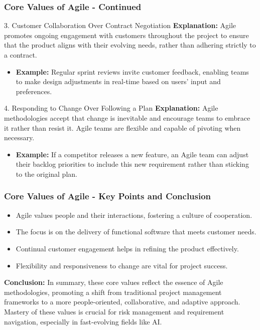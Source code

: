 \documentclass{beamer}
\begin{document}
\begin{frame}[fragile]
    \frametitle{Core Values of Agile - Continued}
    \begin{block}{3. Customer Collaboration Over Contract Negotiation}
        \textbf{Explanation:} Agile promotes ongoing engagement with customers throughout the project to ensure that the product aligns with their evolving needs, rather than adhering strictly to a contract.
        \begin{itemize}
            \item \textbf{Example:} Regular sprint reviews invite customer feedback, enabling teams to make design adjustments in real-time based on users’ input and preferences.
        \end{itemize}
    \end{block}

    \begin{block}{4. Responding to Change Over Following a Plan}
        \textbf{Explanation:} Agile methodologies accept that change is inevitable and encourage teams to embrace it rather than resist it. Agile teams are flexible and capable of pivoting when necessary.
        \begin{itemize}
            \item \textbf{Example:} If a competitor releases a new feature, an Agile team can adjust their backlog priorities to include this new requirement rather than sticking to the original plan.
        \end{itemize}
    \end{block}
\end{frame}

\begin{frame}[fragile]
    \frametitle{Core Values of Agile - Key Points and Conclusion}
    \begin{itemize}
        \item Agile values people and their interactions, fostering a culture of cooperation.
        \item The focus is on the delivery of functional software that meets customer needs.
        \item Continual customer engagement helps in refining the product effectively.
        \item Flexibility and responsiveness to change are vital for project success.
    \end{itemize}

    \textbf{Conclusion:} In summary, these core values reflect the essence of Agile methodologies, promoting a shift from traditional project management frameworks to a more people-oriented, collaborative, and adaptive approach. Mastery of these values is crucial for risk management and requirement navigation, especially in fast-evolving fields like AI.
\end{frame}
\end{document}
